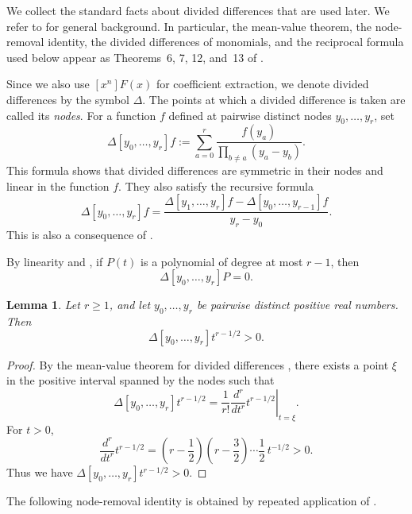 \documentclass[12pt]{amsart}
\newtheorem{Lemma}[Theorem]{Lemma}
\theoremstyle{definition}
\newcommand{\DD}{\Delta}
\begin{document}
We collect the standard facts about divided differences that are used later.
We refer to \cite{deBoorDividedDifferences,DubeauHermite} for general
background.  In particular, the mean-value theorem, the node-removal
identity, the divided differences of monomials, and the reciprocal formula
used below appear as Theorems~6, 7, 12, and~13 of \cite{DubeauHermite}.

Since we also use $[x^n]F(x)$ for coefficient extraction, we denote divided
differences by the symbol $\DD$.  The points at which a divided difference is
taken are called its \emph{nodes}.  For a function $f$ defined at pairwise
distinct nodes $y_0,\ldots,y_r$, set
\begin{equation} \label{didi_def}
    \DD[y_0,\ldots,y_r]f
:=
\sum_{a=0}^r
\frac{f(y_a)}{\prod_{b\ne a}(y_a-y_b)}.
\end{equation}
This formula shows that divided differences are symmetric in their nodes and
linear in the function $f$.  They also satisfy the recursive formula
\begin{equation} \label{didi_rec}
\DD[y_0,\ldots,y_r]f
=
\frac{
\DD[y_1,\ldots,y_r]f-
\DD[y_0,\ldots,y_{r-1}]f
}{y_r-y_0}.
\end{equation}
This is also a consequence of \cite[Theorem~7]{DubeauHermite}.

By linearity and \cite[Theorem~12(i)]{DubeauHermite}, if $P(t)$ is a
polynomial of degree at most $r-1$, then
\begin{equation}\label{didi_deg}
\DD[y_0,\ldots,y_r]P=0.
\end{equation}

\begin{Lemma}\label{lem:power-dd-positive}
Let $r\ge1$, and let $y_0,\ldots,y_r$ be pairwise distinct positive real
numbers.  Then
\[
\DD[y_0,\ldots,y_r]t^{r-1/2}>0.
\]
\end{Lemma}

\begin{proof}
By the mean-value theorem for divided differences
\cite[Theorem~6]{DubeauHermite}, there exists a point $\xi$ in the positive
interval spanned by the nodes such that
\[
\DD[y_0,\ldots,y_r]t^{r-1/2}
=
\frac1{r!}
\left.\frac{d^r}{dt^r}t^{r-1/2}\right|_{t=\xi}.
\]
For $t>0$,
\[
\frac{d^r}{dt^r}t^{r-1/2}
=
\left(r-\frac12\right)
\left(r-\frac32\right)\cdots\frac12\,t^{-1/2}>0.
\]
Thus we have $\DD[y_0,\ldots,y_r]t^{r-1/2}>0$.
\end{proof}

The following node-removal identity is obtained by repeated application of
\cite[Theorem~7]{DubeauHermite}.
\end{document}
